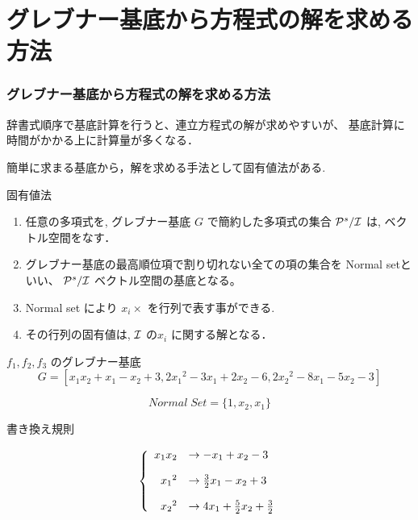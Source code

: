 \section{グレブナー基底から方程式の解を求める方法}
\begin{frame}\frametitle{グレブナー基底から方程式の解を求める方法}
辞書式順序で基底計算を行うと、連立方程式の解が求めやすいが、
基底計算に時間がかかる上に計算量が多くなる．

簡単に求まる基底から，解を求める手法として固有値法がある.

\begin{block}{固有値法}
\begin{enumerate}
\item 任意の多項式を, グレブナー基底 $G$ で簡約した多項式の集合 
${\cal P}^s /{\cal I}$ は, ベクトル空間をなす．

\item グレブナー基底の最高順位項で割り切れない全ての項の集合を
Normal setといい、 ${\cal P}^s /{\cal I}$ ベクトル空間の基底となる。

\item Normal set により $x_i \times $ を行列で表す事ができる.

\item その行列の固有値は, ${\cal I}$ の$x_i$ に関する解となる．
\end{enumerate}
\end{block}
\end{frame}

\begin{frame}
\begin{block}{$f_1,f_2,f_3$ のグレブナー基底}
\[ G = [x_1 x_2 + x_1 - x_2 + 3, 2{x_1}^2-3x_1+2x_2-6,2{x_2}^2-8x_1-5x_2-3] \]

\[Normal \; Set =  \{1,x_2,x_1\}\]
\end{block}

\begin{block}{書き換え規則}

\[ \left\{
\begin{array}{rl}
x_1x_2 & \rightarrow  -x_1+x_2-3\vspace{.15in}\\
{x_1}^2 & \rightarrow  \frac{3}{2}x_1-x_2+3\vspace{.15in}\\
{x_2}^2 & \rightarrow  4x_1+\frac{5}{2}x_2+\frac{3}{2}
\end{array}
\right. \]
\end{block}
\end{frame}

